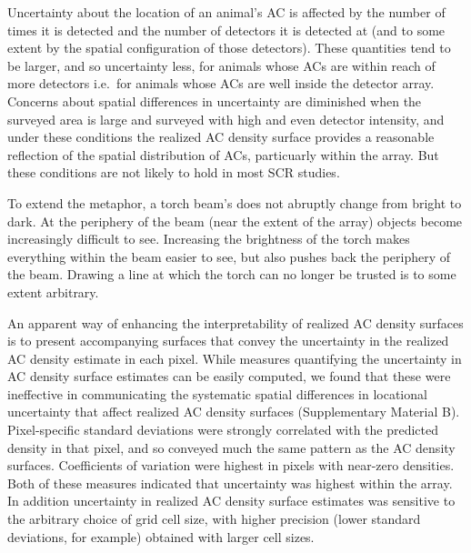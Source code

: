 \documentclass[useAMS,usenatbib,referee]{biom}
\begin{document}
Uncertainty about the location of an animal's AC is affected by the number of times it is detected and the number of detectors it is detected at (and to some extent by the spatial configuration of those detectors). These quantities tend to be larger, and so uncertainty less, for animals whose ACs are within reach of more detectors i.e.\ for animals whose ACs are well inside the detector array. Concerns about spatial differences in uncertainty are diminished when the surveyed area is large and surveyed with high and even detector intensity, and under these conditions the realized AC density surface provides a reasonable reflection of the spatial distribution of ACs, particuarly within the array. But these conditions are not likely to hold in most SCR studies.

To extend the metaphor, a torch beam's does not abruptly change from bright to dark. At the periphery of the beam (near the extent of the array) objects become increasingly difficult to see. Increasing the brightness of the torch makes everything within the beam easier to see, but also pushes back the periphery of the beam. Drawing a line at which the torch can no longer be trusted is to some extent arbitrary. 

An apparent way of enhancing the interpretability of realized AC density surfaces is to present accompanying surfaces that convey the uncertainty in the realized AC density estimate in each pixel. While measures quantifying the uncertainty in AC density surface estimates can be easily computed, we found that these were ineffective in communicating the systematic spatial differences in locational uncertainty that affect realized AC density surfaces (Supplementary Material B). Pixel-specific standard deviations were strongly correlated with the predicted density in that pixel, and so conveyed much the same pattern as the AC density surfaces. Coefficients of variation were highest in pixels with near-zero densities. Both of these measures indicated that uncertainty was highest within the array. In addition uncertainty in realized AC density surface estimates was sensitive to the arbitrary choice of grid cell size, with higher precision (lower standard deviations, for example) obtained with larger cell sizes. 
\end{document}

